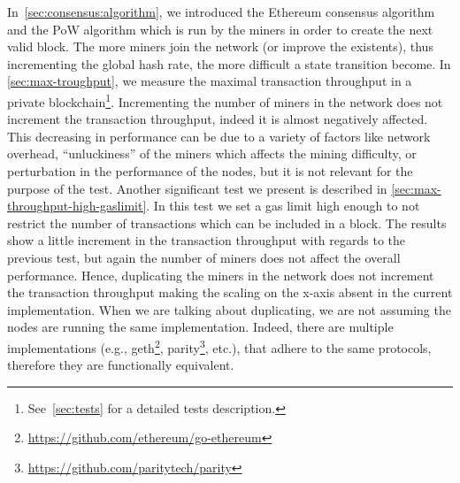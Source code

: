 In~\autoref{sec:consensus:algorithm}, we introduced the Ethereum consensus 
algorithm and the PoW algorithm which is run by the miners in order to create 
the next valid block. The more miners join the network (or improve the 
existents), thus incrementing the global hash rate, the more difficult a state 
transition become. In \autoref{sec:max-troughput}, we measure the maximal 
transaction throughput in a private blockchain\footnote{See~\autoref{sec:tests} 
for a detailed tests description.}. Incrementing the number of miners in the 
network does not increment the transaction throughput, indeed it is almost 
negatively affected. This decreasing in performance can be due to a variety of 
factors like network overhead, ``unluckiness'' of the miners which affects the 
mining difficulty, or perturbation in the performance of the nodes, but it is 
not relevant for the purpose of the test. Another significant test we present 
is described in \autoref{sec:max-throughput-high-gaslimit}. In this test we set 
a gas limit high enough to not restrict the number of transactions which can be 
included in a block. The results show a little increment in the transaction 
throughput with regards to the previous test, but again the number of miners 
does not affect the overall performance. Hence, duplicating the miners in the 
network does not increment the transaction throughput making the scaling on the 
x-axis absent in the current implementation. When we are talking about
duplicating, we are not assuming the nodes are running the same
implementation. Indeed, there are multiple implementations  (e.g., 
geth\footnote{\url{https://github.com/ethereum/go-ethereum}},
parity\footnote{\url{https://github.com/paritytech/parity}}, etc.), that
adhere to the same protocols, therefore they are functionally equivalent.

